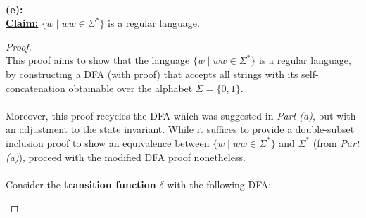 \documentclass[12pt]{article}
\begin{document}
\leavevmode\\
\textbf{(e):} \\
\textbf{\underline{Claim:}} $\{ w \mid ww \in \Sigma^* \}$ is a regular language.
\begin{proof}
\leavevmode\\
    This proof aims to show that the language $\{ w \mid ww \in \Sigma^* \}$ is a regular language, by constructing a DFA (with proof) that accepts all strings with its self-concatenation obtainable over the alphabet $\Sigma = \{0, 1\}$. \\
    \\
    Moreover, this proof recycles the DFA which was suggested in \textit{Part (a)}, but with an adjustment to the state invariant. While it suffices to provide a double-subset inclusion proof to show an equivalence between $\{ w \mid ww \in \Sigma^* \}$ and $\Sigma^*$ (from \textit{Part (a)}), proceed with the modified DFA proof nonetheless. \\
    \\
    Consider the \textbf{transition function} $\delta$ with the following DFA:
    \begin{center}
\end{center}
\end{proof}
\end{document}
